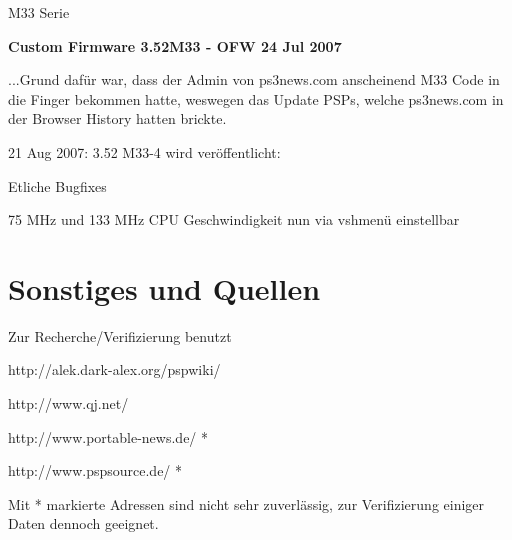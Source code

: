 \documentclass[mode=print,paper=screen,size=10pt,style=paintings]{powerdot}
\begin{document}
\begin{slide}{M33 Serie}
	\begin{large}\textbf{Custom Firmware 3.52M33 - OFW 24 Jul 2007}\end{large}\linebreak
	...Grund dafür war, dass der Admin von ps3news.com anscheinend M33 Code in die Finger bekommen hatte, weswegen das Update
	PSPs, welche ps3news.com in der Browser History hatten brickte.
	\begin{list}{-}{}
		\item{21 Aug 2007: 3.52 M33-4 wird veröffentlicht:\begin{list}{*}{}
				\item{Etliche Bugfixes}
				\item{75 MHz und 133 MHz CPU Geschwindigkeit nun via vshmenü einstellbar}
			\end{list}}
	\end{list}
\end{slide}



\section{Sonstiges und Quellen}
\begin{slide}{Zur Recherche/Verifizierung benutzt}
	\begin{list}{-}{}
		\item{http://alek.dark-alex.org/pspwiki/}
		\item{http://www.qj.net/}
		\item{http://www.portable-news.de/ *}
		\item{http://www.pspsource.de/ *}
	\end{list}
	Mit * markierte Adressen sind nicht sehr zuverlässig, zur Verifizierung einiger Daten dennoch geeignet.
\end{slide}
\end{document}

